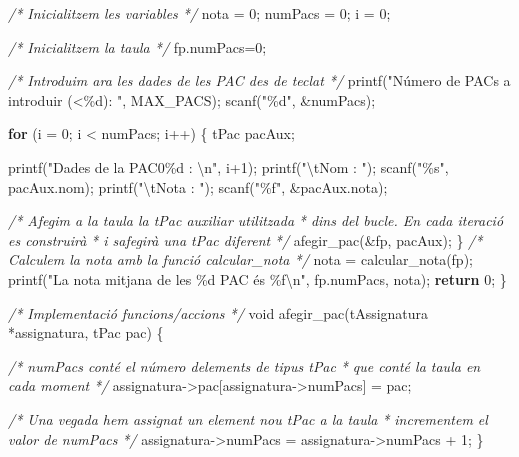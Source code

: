 \documentclass[
]{book}
\newenvironment{Shaded}{\begin{snugshade}}{\end{snugshade}}
\newcommand{\CommentTok}[1]{\textcolor[rgb]{0.56,0.35,0.01}{\textit{#1}}}
\newcommand{\ControlFlowTok}[1]{\textcolor[rgb]{0.13,0.29,0.53}{\textbf{#1}}}
\newcommand{\DataTypeTok}[1]{\textcolor[rgb]{0.13,0.29,0.53}{#1}}
\newcommand{\DecValTok}[1]{\textcolor[rgb]{0.00,0.00,0.81}{#1}}
\newcommand{\NormalTok}[1]{#1}
\newcommand{\SpecialCharTok}[1]{\textcolor[rgb]{0.00,0.00,0.00}{#1}}
\newcommand{\StringTok}[1]{\textcolor[rgb]{0.31,0.60,0.02}{#1}}
\begin{document}
\begin{Shaded}
\begin{Highlighting}[]
    \CommentTok{/* Inicialitzem les variables */}
\NormalTok{    nota = }\DecValTok{0}\NormalTok{;}
\NormalTok{    numPacs = }\DecValTok{0}\NormalTok{;}
\NormalTok{    i = }\DecValTok{0}\NormalTok{;}

    \CommentTok{/* Inicialitzem la taula */}
\NormalTok{    fp.numPacs=}\DecValTok{0}\NormalTok{;}

    \CommentTok{/* Introduim ara les dades de les PAC des de teclat */}
\NormalTok{    printf(}\StringTok{"Número de PACs a introduir (\textless{}\%d): "}\NormalTok{, MAX\_PACS);}
\NormalTok{    scanf(}\StringTok{"\%d"}\NormalTok{, \&numPacs);}

    \ControlFlowTok{for}\NormalTok{ (i = }\DecValTok{0}\NormalTok{; i \textless{} numPacs; i++) \{}
\NormalTok{        tPac pacAux;}

\NormalTok{        printf(}\StringTok{"Dades de la PAC0\%d : }\SpecialCharTok{\textbackslash{}n}\StringTok{"}\NormalTok{, i+}\DecValTok{1}\NormalTok{);}
\NormalTok{        printf(}\StringTok{"}\SpecialCharTok{\textbackslash{}t}\StringTok{Nom : "}\NormalTok{);}
\NormalTok{        scanf(}\StringTok{"\%s"}\NormalTok{, pacAux.nom);}
\NormalTok{        printf(}\StringTok{"}\SpecialCharTok{\textbackslash{}t}\StringTok{Nota : "}\NormalTok{);}
\NormalTok{        scanf(}\StringTok{"\%f"}\NormalTok{, \&pacAux.nota);}

        \CommentTok{/* Afegim a la taula la tPac auxiliar utilitzada}
\CommentTok{         * dins del bucle. En cada iteració es construirà}
\CommentTok{         * i s\textquotesingle{}afegirà una tPac diferent }
\CommentTok{         */}
\NormalTok{        afegir\_pac(\&fp, pacAux);}
\NormalTok{    \}}
    \CommentTok{/* Calculem la nota amb la funció calcular\_nota */}
\NormalTok{    nota = calcular\_nota(fp);}
\NormalTok{    printf(}\StringTok{"La nota mitjana de les \%d PAC és \%f}\SpecialCharTok{\textbackslash{}n}\StringTok{"}\NormalTok{, fp.numPacs, nota);}
    \ControlFlowTok{return} \DecValTok{0}\NormalTok{;}
\NormalTok{\}}

\CommentTok{/* Implementació funcions/accions */}
\DataTypeTok{void}\NormalTok{ afegir\_pac(tAssignatura *assignatura, tPac pac) \{}

    \CommentTok{/* numPacs conté el número d\textquotesingle{}elements de tipus tPac}
\CommentTok{     * que conté la taula en cada moment }
\CommentTok{     */}
\NormalTok{    assignatura{-}\textgreater{}pac[assignatura{-}\textgreater{}numPacs] = pac;}

    \CommentTok{/* Una vegada hem assignat un element nou tPac a la taula}
\CommentTok{     * incrementem el valor de numPacs }
\CommentTok{     */}
\NormalTok{    assignatura{-}\textgreater{}numPacs = assignatura{-}\textgreater{}numPacs + }\DecValTok{1}\NormalTok{;}
\NormalTok{\}}


\end{Highlighting}
\end{Shaded}
\end{document}
